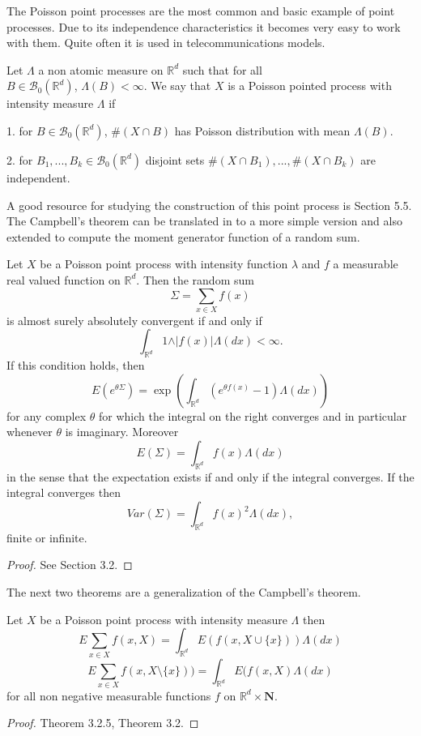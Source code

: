 The Poisson point processes are the most common and basic example of point processes. Due to its independence characteristics it becomes very easy to work with them. Quite often it is used in telecommunications models. 
 
\begin{defn} Let $\Lambda$ a non atomic measure on $\mathbb{R}^d$ such that for all\\ $B\in\mathcal{B}_0(\mathbb{R}^d)$, $\Lambda(B)<\infty$. We say that $X$ is a Poisson pointed process with intensity measure $\Lambda$ if

1. for $B\in\mathcal{B}_0(\mathbb{R}^d)$, $\#(X\cap B)$ has Poisson distribution with mean $\Lambda(B)$.

2. for $B_1, ...,B_k\in\mathcal{B}_0(\mathbb{R}^d) $ disjoint sets $\#(X\cap B_1), ..., \#(X\cap B_k)$ are independent.

\end{defn}
 
A good resource for studying the construction of this point process is \cite{Kingman} Section 5.5. The Campbell's theorem can be translated in to a more simple version and also extended to compute the moment generator function of a random sum.

\begin{thm} [Campbell] Let $X$ be a Poisson point process with intensity function $\lambda$ and $f$ a measurable real valued function on $\mathbb{R}^d$. Then the random sum $$\Sigma=\sum_{x\in X }f(x) $$ is almost surely absolutely convergent if and only if $$\int_{\mathbb{R}^d}1\wedge\vert f(x)\vert\Lambda(dx)<\infty. $$ 
If this condition holds, then $$E(e^{\theta\Sigma})=\exp(\int_{\mathbb{R}^d}(e^{\theta f(x)}-1)\Lambda (dx)) $$ for any complex $\theta$ for which the integral on the right converges and in particular whenever $\theta$ is imaginary. Moreover $$E(\Sigma)=\int_{\mathbb{R}^d}f(x)\Lambda (dx) $$ in the sense that the expectation exists if and only if the integral converges. If the integral converges then
 $$Var(\Sigma)=\int_{\mathbb{R}^d}f(x)^2\Lambda (dx), $$
finite or infinite.
\end{thm}
\begin{proof}
See \cite{Kingman} Section 3.2.
\end{proof}

The next two theorems are a generalization of the Campbell's theorem. 

\begin{thm} Let $X$ be a Poisson point process with intensity measure $\Lambda$ then $$E\sum_{x\in X}f(x, X)=\int_{\mathbb{R}^d}E(f(x,X\cup\lbrace x\rbrace)) \Lambda (dx)$$ 
$$E\sum_{x\in X}f(x, X\setminus\lbrace x\rbrace))=\int_{\mathbb{R}^d}E(f(x,X) \Lambda (dx) $$
for all non negative measurable functions  $f$ on $\mathbb{R}^d\times\textbf{N} $. 
\end{thm}
\begin{proof}
\cite{Sch} Theorem 3.2.5,\cite{Moller} Theorem 3.2.
\end{proof}

